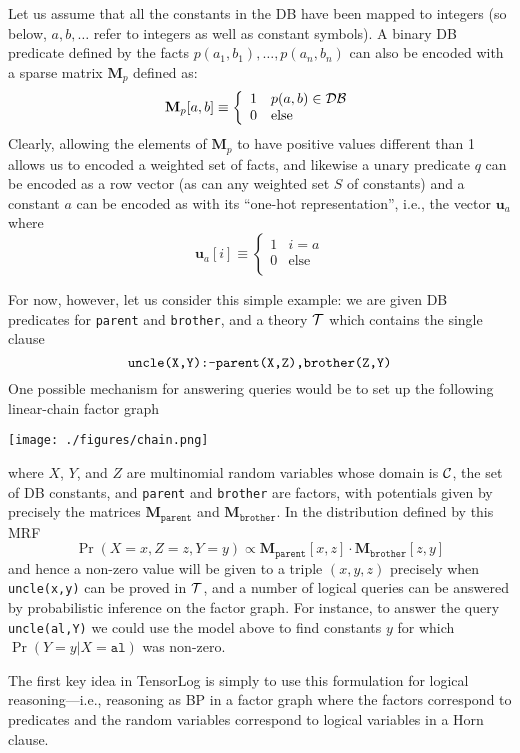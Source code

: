 \documentclass[12pt]{article}
\newcommand{\vek}[1]{\textbf{#1}}
\newcommand{\M}{\textbf{M}}
\begin{document}
Let us assume that all the constants in the DB have been mapped to
integers (so below, $a,b,\ldots$ refer to integers as well as constant
symbols).  A binary DB predicate defined by the facts
$p(a_1,b_1),\ldots,p(a_n,b_n)$ can also be encoded with a sparse
matrix $\M_p$ defined as:
\[
  \M_p[a,b] \equiv \left \{
   \begin{array}{ll}
     1 & p(a,b) \in {\cal DB} \\
     0 & \mbox{else} \\
   \end{array}
   \right.
\]
Clearly, allowing the elements of $\M_p$ to have positive values
different than 1 allows us to encoded a weighted set of facts, and
likewise a unary predicate $q$ can be encoded as a row vector (as can
any weighted set $S$ of constants) and a constant $a$ can be encoded
as with its ``one-hot representation'', i.e., the vector $\vek{u}_a$
where
\[
  \vek{u}_a[i] \equiv \left \{
   \begin{array}{ll}
     1 & \mbox{$i=a$} \\
     0 & \mbox{else} \\
   \end{array}
   \right.
\]

For now, however, let us consider this
simple example: we are given DB predicates for \texttt{parent} and
\texttt{brother}, and a theory ${\cal T}$ which contains the single
clause
\[ \mbox{\texttt{uncle(X,Y):-parent(X,Z),brother(Z,Y)}}
\]
One possible mechanism for answering queries would be to set up the
following linear-chain factor graph

\centerline{\texttt{[image: ./figures/chain.png]}}

\noindent where $X$, $Y$, and $Z$ are multinomial random variables
whose domain is ${\cal C}$, the set of DB constants, and
\texttt{parent} and \texttt{brother} are factors, with potentials
given by precisely the matrices $\M_\texttt{parent}$ and
$\M_\texttt{brother}$.  In the distribution defined by this MRF
\[ \Pr(X=x,Z=z,Y=y) \propto \M_\texttt{parent}[x,z] \cdot \M_\texttt{brother}[z,y]
\]
and hence a non-zero value will be given to a triple $(x,y,z)$
precisely when \texttt{uncle(x,y)} can be proved in ${\cal T}$, and a
number of logical queries can be answered by probabilistic inference
on the factor graph. For instance, to answer the query
\texttt{uncle(al,Y)} we could use the model above to find constants
$y$ for which \( \Pr(Y=y|X=\texttt{al}) \) was non-zero.

The first key idea in TensorLog is simply to use this formulation for
logical reasoning---i.e., reasoning as BP in a factor graph where the
factors correspond to predicates and the random variables correspond
to logical variables in a Horn clause.
\end{document}
